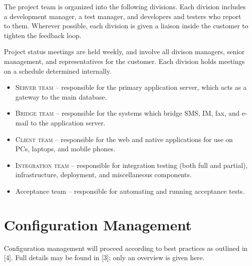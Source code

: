 \documentclass[11pt]{wacomepd}
\begin{document}

The project team is organized into the following divisions.  Each division includes a development
manager, a test manager, and developers and testers who report to them.  Wherever possible, each
division is given a liaison inside the customer to tighten the feedback loop.

Project status meetings are held weekly, and involve all divison managers, senior management, and
representatives for the customer.  Each division holds meetings on a schedule determined internally.

\begin{itemize}
\item \textsc{Server team} -- responsible for the primary application server, which acts as a
  gateway to the main database.
\item \textsc{Bridge team} -- responsible for the systems which bridge SMS, IM, fax, and e-mail to
  the application server.
\item \textsc{Client team} -- responsible for the web and native applications for use on PCs,
  laptops, and mobile phones.
\item \textsc{Integration team} -- responsible for integration testing (both full and partial),
  infrastructure, deployment, and miscellaneous components.
\item {\sc Acceptance team} -- responsible for automating and running acceptance tests.
\end{itemize}



\chapter{Configuration Management}

Configuration management will proceed according to best practices as outlined in [4].  Full details
may be found in [3]; only an overview is given here.
\end{document}
